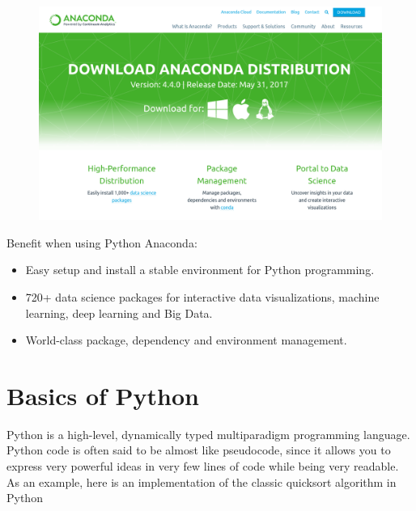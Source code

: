 \documentclass[11pt]{article}
\makeatletter
\def\maxwidth{\ifdim\Gin@nat@width>\linewidth\linewidth
    \else\Gin@nat@width\fi}
\let\Oldincludegraphics\includegraphics
\renewcommand{\includegraphics}[1]{\Oldincludegraphics[width=.8\maxwidth]{#1}}
\providecommand{\tightlist}{%
      \setlength{\itemsep}{0pt}\setlength{\parskip}{0pt}}
\makeatother
\begin{document}
\begin{figure}
\centering
\includegraphics{figs/session_1/anaconda.png}
\caption{}
\end{figure}

Benefit when using Python Anaconda:

\begin{itemize}
\tightlist
\item
  Easy setup and install a stable environment for Python programming.
\item
  720+ data science packages for interactive data visualizations,
  machine learning, deep learning and Big Data.
\item
  World-class package, dependency and environment management.
\end{itemize}

\section{Basics of Python}\label{basics-of-python}

Python is a high-level, dynamically typed multiparadigm programming
language. Python code is often said to be almost like pseudocode, since
it allows you to express very powerful ideas in very few lines of code
while being very readable. As an example, here is an implementation of
the classic quicksort algorithm in Python
\end{document}
